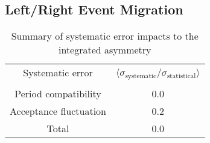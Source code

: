 \subsection{Left/Right Event Migration}

\begin{table}[h!t]
  \centering
  \begin{tabular}{|c|c|}
    \hline Systematic error& \multirow{2}{9em}{$\langle
      \sigma_{\mathrm{systematic}}/\sigma_{\mathrm{statistical}}
      \rangle$}\\ & \\ \hline
    
    Period compatibility& 0.0\\ \hline

    Acceptance fluctuation& 0.2\\ \hline

    Total& 0.0\\\hline
    
  \end{tabular}
  \caption{Summary of systematic error impacts to the integrated asymmetry}
  \label{tab::sysError}
\end{table}
